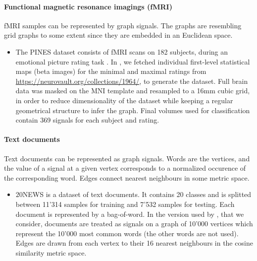 \paragraph{Functional magnetic resonance imagings (fMRI)}
fMRI samples can be represented by graph signals. The graphs are resembling grid graphs to some extent since they are embedded in an Euclidean space.
\begin{itemize}
  \item The PINES dataset consists of fMRI scans on 182 subjects, during an emotional picture rating task \citep{chang2015sensitive}. In \citep{lassance2018matching}, we fetched individual first-level statistical maps (beta images) for the minimal and maximal ratings from \url{https://neurovault.org/collections/1964/}, to generate the dataset. Full brain data was masked on the MNI template and resampled to a 16mm cubic grid, in order to reduce dimensionality of the dataset while keeping a regular geometrical structure to infer the graph. Final volumes used for classification contain 369 signals for each subject and rating.
\end{itemize}

\paragraph{Text documents}
Text documents can be represented as graph signals. Words are the vertices, and the value of a signal at a given vertex corresponds to a normalized occurence of the corresponding word. Edges connect nearest neighbours in some metric space.
\begin{itemize}
  \item $20$NEWS \citep{joachims1996probabilistic} is a dataset of text documents. It contains 20 classes and is splitted between 11'314 samples for training and 7'532 samples for testing. Each document is represented by a bag-of-word. In the version used by \cite{defferrard2016convolutional}, that we consider, documents are treated as signals on a graph of 10'000 vertices which represent the 10'000 most common words (the other words are not used). Edges are drawn from each vertex to their 16 nearest neighbours in the cosine similarity metric space.
\end{itemize}

